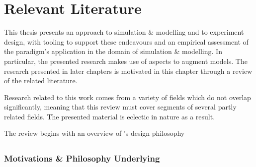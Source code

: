 \chapter{Relevant Literature}\label{chap:lit_review}


This thesis presents an \aspectoriented{} approach to simulation \& modelling
and to experiment design, with tooling to support these endeavours and an
empirical assessment of the paradigm's application in the domain of simulation
\& modelling. In particular, the presented research makes use of aspects to
augment models. The research presented in later chapters is motivated in this
chapter through a review of the related literature.

Research related to this work comes from a variety of fields which do not
overlap significantly, meaning that this review must cover segments of several
partly related fields. The presented material is eclectic in nature as a result.

The review begins with an overview of \aop{}'s design philosophy




\section{\AOP{}}
\label{aspect_oriented_programming_litreview}

\subsection{Motivations \& Philosophy Underlying \AspectOrientation{}}
\label{review_aop_motivations_and_philosophy}


